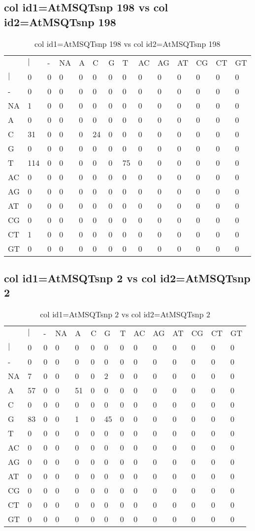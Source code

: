 \subsection{col id1=AtMSQTsnp 198 vs col id2=AtMSQTsnp 198}
\begin{center}
\begin{longtable}{|l|l|l|l|l|l|l|l|l|l|l|l|l|l|}
\caption{col id1=AtMSQTsnp 198 vs col id2=AtMSQTsnp 198} \label{table_dm576}\\
\hline
\\
\hline
&$|$&-&NA&A&C&G&T&AC&AG&AT&CG&CT&GT\\
$|$&0&0&0&0&0&0&0&0&0&0&0&0&0\\
-&0&0&0&0&0&0&0&0&0&0&0&0&0\\
NA&1&0&0&0&0&0&0&0&0&0&0&0&0\\
A&0&0&0&0&0&0&0&0&0&0&0&0&0\\
C&31&0&0&0&24&0&0&0&0&0&0&0&0\\
G&0&0&0&0&0&0&0&0&0&0&0&0&0\\
T&114&0&0&0&0&0&75&0&0&0&0&0&0\\
AC&0&0&0&0&0&0&0&0&0&0&0&0&0\\
AG&0&0&0&0&0&0&0&0&0&0&0&0&0\\
AT&0&0&0&0&0&0&0&0&0&0&0&0&0\\
CG&0&0&0&0&0&0&0&0&0&0&0&0&0\\
CT&1&0&0&0&0&0&0&0&0&0&0&0&0\\
GT&0&0&0&0&0&0&0&0&0&0&0&0&0\\
\hline
\end{longtable}
\end{center}

\subsection{col id1=AtMSQTsnp 2 vs col id2=AtMSQTsnp 2}
\begin{center}
\begin{longtable}{|l|l|l|l|l|l|l|l|l|l|l|l|l|l|}
\caption{col id1=AtMSQTsnp 2 vs col id2=AtMSQTsnp 2} \label{table_dm578}\\
\hline
\\
\hline
&$|$&-&NA&A&C&G&T&AC&AG&AT&CG&CT&GT\\
$|$&0&0&0&0&0&0&0&0&0&0&0&0&0\\
-&0&0&0&0&0&0&0&0&0&0&0&0&0\\
NA&7&0&0&0&0&2&0&0&0&0&0&0&0\\
A&57&0&0&51&0&0&0&0&0&0&0&0&0\\
C&0&0&0&0&0&0&0&0&0&0&0&0&0\\
G&83&0&0&1&0&45&0&0&0&0&0&0&0\\
T&0&0&0&0&0&0&0&0&0&0&0&0&0\\
AC&0&0&0&0&0&0&0&0&0&0&0&0&0\\
AG&0&0&0&0&0&0&0&0&0&0&0&0&0\\
AT&0&0&0&0&0&0&0&0&0&0&0&0&0\\
CG&0&0&0&0&0&0&0&0&0&0&0&0&0\\
CT&0&0&0&0&0&0&0&0&0&0&0&0&0\\
GT&0&0&0&0&0&0&0&0&0&0&0&0&0\\
\hline
\end{longtable}
\end{center}

